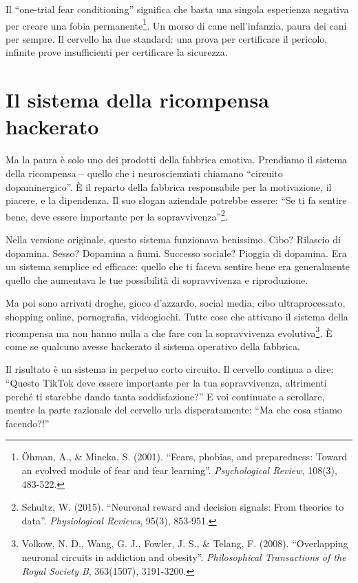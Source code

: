 Il ``one-trial fear conditioning'' significa che basta una singola esperienza negativa per creare una fobia permanente\footnote{Öhman, A., \& Mineka, S. (2001). ``Fears, phobias, and preparedness: Toward an evolved module of fear and fear learning''. \textit{Psychological Review}, 108(3), 483-522.}. Un morso di cane nell'infanzia, paura dei cani per sempre. Il cervello ha due standard: una prova per certificare il pericolo, infinite prove insufficienti per certificare la sicurezza.

\section{Il sistema della ricompensa hackerato}

Ma la paura è solo uno dei prodotti della fabbrica emotiva. Prendiamo il sistema della ricompensa -- quello che i neuroscienziati chiamano ``circuito dopaminergico''. È il reparto della fabbrica responsabile per la motivazione, il piacere, e la dipendenza. Il suo slogan aziendale potrebbe essere: ``Se ti fa sentire bene, deve essere importante per la sopravvivenza''\footnote{Schultz, W. (2015). ``Neuronal reward and decision signals: From theories to data''. \textit{Physiological Reviews}, 95(3), 853-951.}.

Nella versione originale, questo sistema funzionava benissimo. Cibo? Rilascio di dopamina. Sesso? Dopamina a fiumi. Successo sociale? Pioggia di dopamina. Era un sistema semplice ed efficace: quello che ti faceva sentire bene era generalmente quello che aumentava le tue possibilità di sopravvivenza e riproduzione.

Ma poi sono arrivati droghe, gioco d'azzardo, social media, cibo ultraprocessato, shopping online, pornografia, videogiochi. Tutte cose che attivano il sistema della ricompensa ma non hanno nulla a che fare con la sopravvivenza evolutiva\footnote{Volkow, N. D., Wang, G. J., Fowler, J. S., \& Telang, F. (2008). ``Overlapping neuronal circuits in addiction and obesity''. \textit{Philosophical Transactions of the Royal Society B}, 363(1507), 3191-3200.}. È come se qualcuno avesse hackerato il sistema operativo della fabbrica.

Il risultato è un sistema in perpetuo corto circuito. Il cervello continua a dire: ``Questo TikTok deve essere importante per la tua sopravvivenza, altrimenti perché ti starebbe dando tanta soddisfazione?'' E voi continuate a scrollare, mentre la parte razionale del cervello urla disperatamente: ``Ma che cosa stiamo facendo?!''

